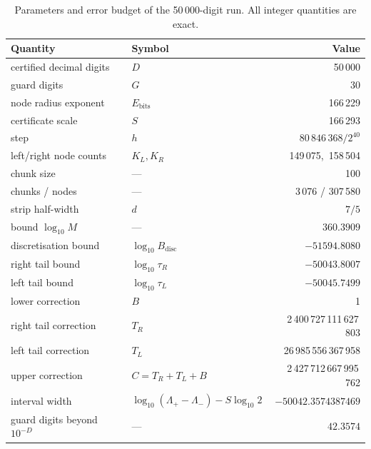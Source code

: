 \documentclass[11pt,a4paper]{article}
\theoremstyle{remark}
\begin{document}
\begin{table}[ht]
\centering
\small
\begin{tabular}{@{}llr@{}}
\toprule
Quantity & Symbol & Value \\
\midrule
certified decimal digits        & $D$              & 50\,000 \\
guard digits                    & $G$              & 30 \\
node radius exponent            & $E_{\mathrm{bits}}$ & 166\,229 \\
certificate scale               & $S$              & 166\,293 \\
step                            & $h$              & $80\,846\,368/2^{40}$ \\
left/right node counts          & $K_L,K_R$        & 149\,075,\ 158\,504 \\
chunk size                      & ---              & 100 \\
chunks / nodes                  & ---              & 3\,076 / 307\,580 \\
\midrule
strip half-width                & $d$              & $7/5$ \\
bound $\log_{10}M$              & ---              & $360.3909$ \\
discretisation bound            & $\log_{10}B_{\mathrm{disc}}$ & $-51594.8080$ \\
right tail bound                & $\log_{10}\tau_R$ & $-50043.8007$ \\
left tail bound                 & $\log_{10}\tau_L$ & $-50045.7499$ \\
\midrule
lower correction                & $B$              & 1 \\
right tail correction           & $T_R$            & 2\,400\,727\,111\,627\,803 \\
left tail correction            & $T_L$            & 26\,985\,556\,367\,958 \\
upper correction                & $C=T_R+T_L+B$    & 2\,427\,712\,667\,995\,762 \\
\midrule
interval width                  & $\log_{10}(\Lambda_+-\Lambda_-)-S\log_{10}2$ & $-50042.3574387469$ \\
guard digits beyond $10^{-D}$   & ---              & $42.3574$ \\
\bottomrule
\end{tabular}
\caption{Parameters and error budget of the 50\,000-digit run. All
integer quantities are exact.}
\label{tab:params}
\end{table}
\end{document}
